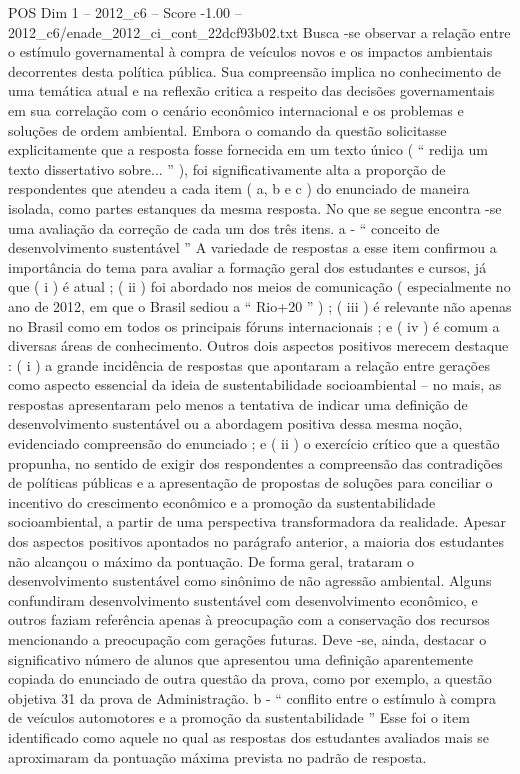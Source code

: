 \begin{textsample}{POS Dim 1 – 2012\_c6 – Score -1.00 – 2012\_c6/enade\_2012\_ci\_cont\_22dcf93b02.txt}
Busca -se observar a relação entre o estímulo governamental à compra de veículos novos e os impactos ambientais decorrentes desta política pública.
Sua compreensão implica no conhecimento de uma temática atual e na reflexão critica a respeito das decisões governamentais em sua correlação com o cenário econômico internacional e os problemas e soluções de ordem ambiental.
Embora o comando da questão solicitasse explicitamente que a resposta fosse fornecida em um texto único ( “ redija um texto dissertativo sobre... ” ), foi significativamente alta a proporção de respondentes que atendeu a cada item ( a, b e c ) do enunciado de maneira isolada, como partes estanques da mesma resposta.
No que se segue encontra -se uma avaliação da correção de cada um dos três itens. a - “ conceito de desenvolvimento sustentável ” A variedade de respostas a esse item confirmou a importância do tema para avaliar a formação geral dos estudantes e cursos, já que ( i ) é atual ; ( ii ) foi abordado nos meios de comunicação ( especialmente no ano de 2012, em que o Brasil sediou a “ Rio+20 ” ) ; ( iii ) é relevante não apenas no Brasil como em todos os principais fóruns internacionais ; e ( iv ) é comum a diversas áreas de conhecimento.
Outros dois aspectos positivos merecem destaque : ( i ) a grande incidência de respostas que apontaram a relação entre gerações como aspecto essencial da ideia de sustentabilidade socioambiental – no mais, as respostas apresentaram pelo menos a tentativa de indicar uma definição de desenvolvimento sustentável ou a abordagem positiva dessa mesma noção, evidenciado compreensão do enunciado ; e ( ii ) o exercício crítico que a questão propunha, no sentido de exigir dos respondentes a compreensão das contradições de políticas públicas e a apresentação de propostas de soluções para conciliar o incentivo do crescimento econômico e a promoção da sustentabilidade socioambiental, a partir de uma perspectiva transformadora da realidade.
Apesar dos aspectos positivos apontados no parágrafo anterior, a maioria dos estudantes não alcançou o máximo da pontuação.
De forma geral, trataram o desenvolvimento sustentável como sinônimo de não agressão ambiental.
Alguns confundiram desenvolvimento sustentável com desenvolvimento econômico, e outros faziam referência apenas à preocupação com a conservação dos recursos mencionando a preocupação com gerações futuras.
Deve -se, ainda, destacar o significativo número de alunos que apresentou uma definição aparentemente copiada do enunciado de outra questão da prova, como por exemplo, a questão objetiva 31 da prova de Administração. b - “ conflito entre o estímulo à compra de veículos automotores e a promoção da sustentabilidade ” Esse foi o item identificado como aquele no qual as respostas dos estudantes avaliados mais se aproximaram da pontuação máxima prevista no padrão de resposta.

\end{textsample}
